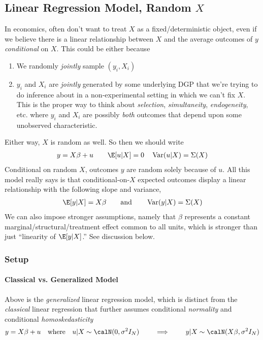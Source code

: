 \documentclass[12pt]{article}
\theoremstyle{plain}
\theoremstyle{definition}
\theoremstyle{remark}
\newcommand{\Var}{\operatorname{Var}}
\begin{document}
\subsection{Linear Regression Model, Random $X$}
In economics, often don't want to treat $X$ as a fixed/deterministic
object, even if we believe there is a linear relationship between $X$
and the average outcomes of $y$ \emph{conditional} on $X$.
This could be either because
\begin{enumerate}
  \item We randomly \emph{jointly} sample $(y_i,X_i)$
  \item $y_i$ and $X_i$ are \emph{jointly} generated by some underlying
    DGP that we're trying to do inference about in a non-experimental
    setting in which we can't fix $X$.
    This is the proper way to think about \emph{selection},
    \emph{simultaneity}, \emph{endogeneity}, etc. where $y_i$ and $X_i$
    are possibly \emph{both} outcomes that depend upon some unobserved
    characteristic.
\end{enumerate}
Either way, $X$ is random as well.
So then we should write
\begin{align}
  y = X\beta + u
  \qquad
  \E[u|X]=0
  \quad
  \Var(u|X)=\Sigma(X)
  \label{classicalecon}
\end{align}
Conditional on random $X$, outcomes $y$ are random solely because of
$u$.
All this model really says is that conditional-on-$X$ expected outcomes
display a linear relationship with the following slope and variance,
\begin{align*}
  \E[y|X]=X\beta
  \qquad\text{and}\qquad
  \Var(y|X)=\Sigma(X)
\end{align*}
We can also impose stronger assumptions, namely that $\beta$ represents
a constant marginal/structural/treatment effect common to all units,
which is stronger than just ``linearity of $\E[y|X]$.''
See discussion below.


\subsubsection{Setup}

\paragraph{Classical vs. Generalized Model}
Above is the \emph{generalized} linear regression model, which is
distinct from the \emph{classical} linear regression that further
assumes conditional \emph{normality} and conditional
\emph{homoskedasticity}
\begin{align*}
  y=X\beta+u
  \quad\text{where}\quad
  u|X\sim\calN(0,\sigma^2I_N)
  \qquad\implies\qquad
  y|X\sim \calN(X\beta,\sigma^2 I_N)
\end{align*}
\end{document}
